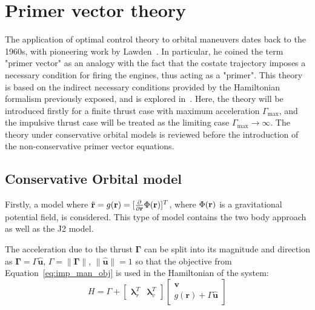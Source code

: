 \section{Primer vector theory}
The application of optimal control theory to orbital maneuvers dates back to the 1960s, with pioneering work by Lawden~\cite{Conway_2010}. In particular, he coined the term "primer vector"  as an analogy with the fact that the costate trajectory imposes a necessary condition for firing the engines, thus acting as a "primer". This theory is based on the indirect necessary conditions provided by the Hamiltonian formalism previously exposed, and is explored in~. Here, the theory will be introduced firstly for a finite thrust case with maximum acceleration \(\Gamma_{\max}\), and the impulsive thrust case will be treated as the limiting case \(\Gamma_{\max} \rightarrow \infty\). The theory under conservative orbital models is reviewed before the introduction of the non-conservative primer vector equations.

\subsection{Conservative Orbital model}

Firstly, a model where \(\ddot{\mathbf{r}} = g(\mathbf{r}) = [\frac{\partial}{\partial \mathbf{r}} \Phi(\mathbf{r})]^T\), where \(\Phi(\mathbf{r})\) is a gravitational potential field, is considered. This type of model contains the two body approach as well as the J2 model. 

The acceleration due to the thrust \(\mathbf{\Gamma} \) can be split into its magnitude and direction as \(\mathbf{\Gamma} = \Gamma \hat{\mathbf{u}}\), \(\Gamma = \lVert \mathbf{\Gamma} \rVert\), \(\lVert \hat{\mathbf{u}} \rVert = 1\) so that the objective from Equation~\eqref{eq:imp_man_obj} is used in the Hamiltonian of the system:
\begin{equation}
    H = \Gamma + \begin{bmatrix}
        \boldsymbol{\lambda}_r^T & \boldsymbol{\lambda}_v^T
    \end{bmatrix} \begin{bmatrix}
        \mathbf{v} \\ g(\mathbf{r}) + \Gamma \hat{\mathbf{u}}
    \end{bmatrix}
\end{equation}

